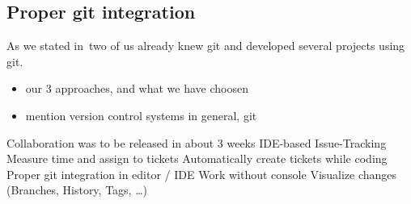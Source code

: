 \subsection{Proper git integration}
As we stated in~ two of us already knew git and developed several projects using git.


\begin{itemize}
	\item our 3 approaches, and what we have choosen
	\item mention version control systems in general, git
\end{itemize}


Collaboration was to be released in about 3 weeks
IDE-based Issue-Tracking
	Measure time and assign to tickets
	Automatically create tickets while coding
Proper git integration in editor / IDE
	Work without console
	Visualize changes
	(Branches, History, Tags, …)

